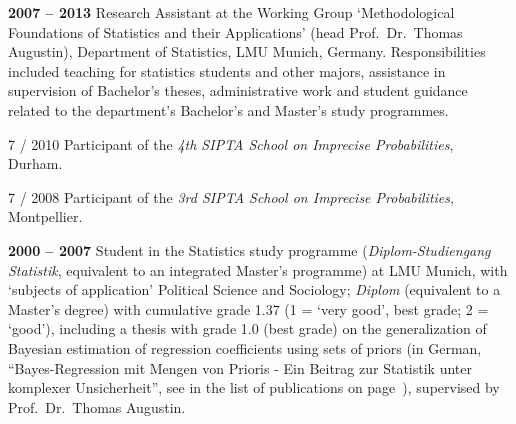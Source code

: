 \documentclass[a4paper]{simplecv}
\begin{document}
\begin{topic}
\item[\hspace*{-2ex}\bfseries 2007 -- 2013] Research Assistant at the Working Group `Methodological Foundations of Statistics and their Applications'
                    (head Prof.\ Dr.\ Thomas Augustin),
                    Department of Statistics, LMU Munich, Germany.
                    Responsibilities included teaching for statistics students and other majors, %
                    assistance in supervision of Bachelor's theses,
                    administrative work and student guidance related to the department's Bachelor's and Master's study programmes.

\item[7 / 2010] Participant of the \emph{4th SIPTA School on Imprecise Probabilities}, Durham. %

\item[7 / 2008] Participant of the \emph{3rd SIPTA School on Imprecise Probabilities}, Montpellier. %

\item[\hspace*{-2ex}\bfseries 2000 -- 2007] Student in the Statistics study programme %
(\emph{Di\-plom-Studiengang Statistik}, equivalent to an integrated Master's programme) %
at LMU Munich,
with `subjects of application' Political Science and Sociology;
%
\emph{Diplom} (equivalent to a Master's degree) with cumulative grade 1.37
(1 = `very good', best grade; 2 = `good'), including a thesis
with grade 1.0 (best grade) %
on the generalization of Bayesian estimation of regression coefficients using sets of priors
(in German, ``Bayes-Regression mit Mengen von Prioris - Ein Beitrag zur Statistik unter komplexer Unsicherheit'',
see \cite{Walter2006a} in the list of publications on page~\pageref{publications}),
supervised by Prof.\ Dr.\ Thomas Augustin.


\end{topic}
\end{document}
